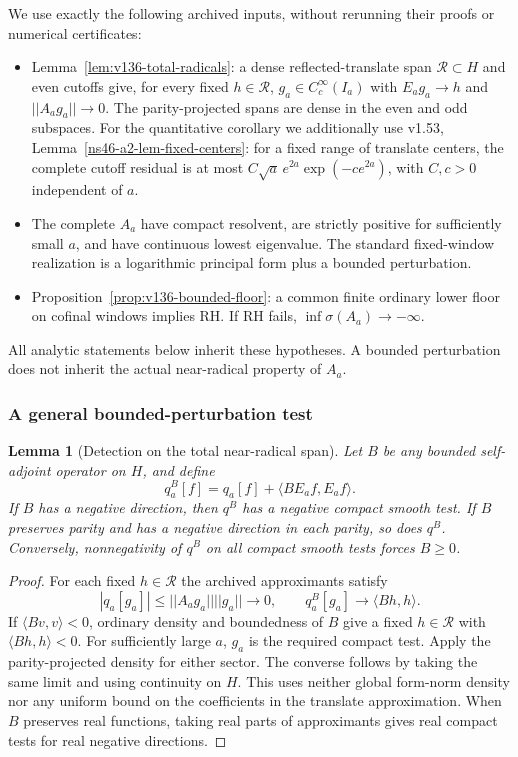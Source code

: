 \documentclass[11pt]{article}
\def\norm#1{||#1||}%
\newtheorem{lemma}[theorem]{Lemma}
\theoremstyle{remark}
\newcommand{\norm}[1]{\left\lVert #1\right\rVert}
\begin{document}
We use exactly the following archived inputs, without rerunning their proofs
or numerical certificates:
\begin{itemize}
\item Lemma~\ref{lem:v136-total-radicals}: a dense reflected-translate
span $\mathcal R\subset H$ and even cutoffs give, for every fixed
$h\in\mathcal R$, $g_a\in C_c^\infty(I_a)$ with
$E_ag_a\to h$ and $\norm{A_ag_a}\to0$.
The parity-projected spans are dense in the even and odd subspaces.
For the quantitative corollary we additionally use v1.53,
Lemma~\ref{ns46-a2-lem-fixed-centers}: for a fixed range of translate
centers, the complete cutoff residual is at most
$C\sqrt a\,e^{2a}\exp(-c e^{2a})$, with $C,c>0$ independent of $a$.
\item The complete $A_a$ have compact resolvent, are strictly positive
for sufficiently small $a$, and have continuous lowest eigenvalue.
The standard fixed-window realization is a logarithmic principal form
plus a bounded perturbation.
\item Proposition~\ref{prop:v136-bounded-floor}: a common finite
ordinary lower floor on cofinal windows implies RH. If RH fails,
$\inf\sigma(A_a)\to-\infty$.
\end{itemize}
All analytic statements below inherit these hypotheses. A bounded perturbation
does not inherit the actual near-radical property of $A_a$.

\subsubsection{A general bounded-perturbation test}
\begin{lemma}[Detection on the total near-radical span]\label{lem:ns57-bounded-detection}
Let $B$ be any bounded self-adjoint operator on $H$, and define
\[
 q_a^B[f]=q_a[f]+\langle BE_af,E_af\rangle.
\]
If $B$ has a negative direction, then $q^B$ has a negative compact
smooth test. If $B$ preserves parity and has a negative direction
in each parity, so does $q^B$. Conversely, nonnegativity of $q^B$
on all compact smooth tests forces $B\ge0$.
\end{lemma}
\begin{proof}
For each fixed $h\in\mathcal R$ the archived approximants satisfy
\[
 |q_a[g_a]|\le\norm{A_ag_a}\norm{g_a}\longrightarrow0,
 \qquad q_a^B[g_a]\longrightarrow\langle Bh,h\rangle.
\]
If $\langle Bv,v\rangle<0$, ordinary density and boundedness of $B$
give a fixed $h\in\mathcal R$ with $\langle Bh,h\rangle<0$.
For sufficiently large $a$, $g_a$ is the required compact test.
Apply the parity-projected density for either sector. The converse
follows by taking the same limit and using continuity on $H$.
This uses neither global form-norm density nor any uniform bound
on the coefficients in the translate approximation.
When $B$ preserves real functions, taking real parts of approximants
gives real compact tests for real negative directions.
\end{proof}
\end{document}
